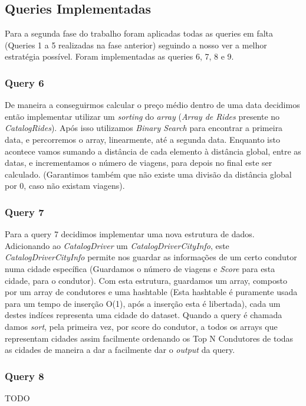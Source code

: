 \documentclass{article}
\begin{document}
    \subsection{Queries Implementadas}
        Para a segunda fase do trabalho foram aplicadas todas as queries em falta
        (Queries 1 a 5 realizadas na fase anterior) seguindo a nosso ver a melhor
        estratégia possível. Foram implementadas as queries 6, 7, 8 e 9.
        \subsubsection{Query 6}
            De maneira a conseguirmos calcular o preço médio dentro de uma data decidimos 
            então implementar utilizar um \emph{sorting} do \emph{array} (\emph{Array de Rides}
            presente no \emph{CatalogRides}). Após isso utilizamos \emph{Binary Search} para
            encontrar a primeira data, e percorremos o array, linearmente, até a segunda data.
            Enquanto isto acontece vamos sumando a distância de cada elemento à distância global,
            entre as datas, e incrementamos o número de viagens, para depois no final este ser 
            calculado. (Garantimos também que não existe uma divisão da distância global por 0, 
            caso não existam viagens).
        \subsubsection{Query 7}
            Para a query 7 decidimos implementar uma nova estrutura de dados. Adicionando ao 
            \emph{CatalogDriver} um \emph{CatalogDriverCityInfo}, este \emph{CatalogDriverCityInfo} 
            permite nos guardar as informações de um certo condutor numa cidade específica 
            (Guardamos o número de viagens e \emph{Score} para esta cidade, para o condutor).
            Com esta estrutura, guardamos um array, composto por um array de condutores 
            e uma hashtable (Esta hashtable é puramente usada para um tempo de inserção O(1), após 
            a inserção esta é libertada), cada um destes indíces representa uma cidade do dataset.
            Quando a query é chamada damos \emph{sort}, pela primeira vez, por score do condutor, a 
            todos os arrays que representam cidades assim facilmente ordenando os Top N Condutores 
            de todas as cidades de maneira a dar a facilmente dar o \emph{output} da query.
            
        \subsubsection{Query 8}
            TODO
\end{document}
